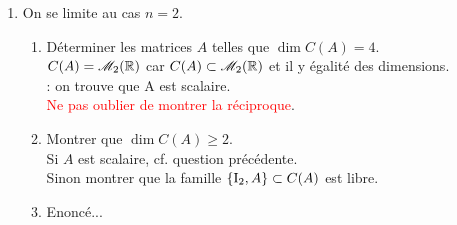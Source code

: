 \begin{enumerate}
\begin{itemize}
\begin{itemize}
        \end{itemize}
    \end{itemize}
    \item On se limite au cas $n = 2$. 
    \begin{enumerate}
        \item Déterminer les matrices $A$ telles que $\dim C(A) = 4$. \\
        $C(A) = \mathscr{M}_2(\mathbb{R})$ car $C(A) \subset \mathscr{M}_2(\mathbb{R})$ et il y égalité des dimensions. \\
        : on trouve que A est scalaire. \\
        \textcolor{red}{Ne pas oublier de montrer la réciproque}. 
        \item Montrer que $\dim C(A) \geqslant 2$. \\
        Si $A$ est scalaire, cf. question précédente. \\
        Sinon montrer que la famille $\{ \mathrm{I}_2, A \} \subset C(A)$ est libre. 
        \item Enoncé... \\
    \end{enumerate}
\end{enumerate}
